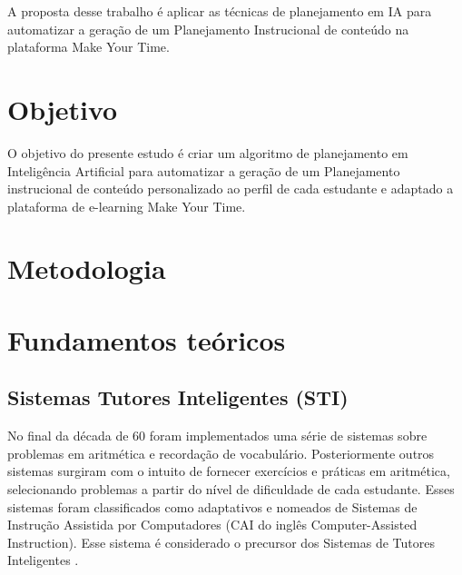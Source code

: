 \documentclass[
12pt,				%
oneside,			%
a4paper,			%
english,			%
brazil				%
]{abntex2ppgsi}
\begin{document}
A proposta desse trabalho é aplicar as técnicas de planejamento em IA para automatizar a geração de um Planejamento Instrucional de conteúdo na plataforma Make Your Time.

\chapter{Objetivo}

O objetivo do presente estudo é criar um algoritmo de planejamento em Inteligência Artificial para automatizar a geração de um Planejamento instrucional de conteúdo personalizado ao perfil de cada estudante e adaptado a plataforma de e-learning Make Your Time.

\chapter{Metodologia}

\chapter{Fundamentos teóricos}

\section{Sistemas Tutores Inteligentes (STI)}

No final da década de 60 foram implementados uma série de sistemas sobre problemas em aritmética e recordação de vocabulário. Posteriormente outros sistemas surgiram com o intuito de fornecer exercícios e práticas em aritmética, selecionando problemas a partir do nível de dificuldade de cada estudante. Esses sistemas foram classificados como adaptativos e nomeados de Sistemas de Instrução Assistida por Computadores (CAI do inglês Computer-Assisted Instruction). Esse sistema é considerado o precursor dos Sistemas de Tutores Inteligentes \cite{sleeman1982}.
\end{document}
